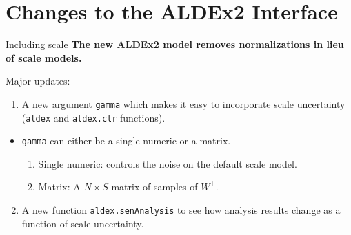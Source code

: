 \documentclass[
  ignorenonframetext,
]{beamer}
\providecommand{\tightlist}{%
  \setlength{\itemsep}{0pt}\setlength{\parskip}{0pt}}
\begin{document}
\hypertarget{changes-to-the-aldex2-interface}{%
\section{Changes to the ALDEx2
Interface}\label{changes-to-the-aldex2-interface}}

\begin{frame}[fragile]{Including scale}
\protect\hypertarget{including-scale}{}
\textbf{The new ALDEx2 model removes normalizations in lieu of scale
models.}

\vspace{.25in}

\pause

Major updates:

\begin{enumerate}
\tightlist
\item
  A new argument \texttt{gamma} which makes it easy to incorporate scale
  uncertainty (\texttt{aldex} and \texttt{aldex.clr} functions).
\end{enumerate}

\begin{itemize}
\tightlist
\item
  \texttt{gamma} can either be a single numeric or a matrix.

  \begin{enumerate}
  \tightlist
  \item
    Single numeric: controls the noise on the default scale model.
  \item
    Matrix: A \(N \times S\) matrix of samples of \(W^\perp\).
  \end{enumerate}
\end{itemize}

\begin{enumerate}
\setcounter{enumi}{1}
\tightlist
\item
  A new function \texttt{aldex.senAnalysis} to see how analysis results
  change as a function of scale uncertainty.
\end{enumerate}
\end{frame}
\end{document}
